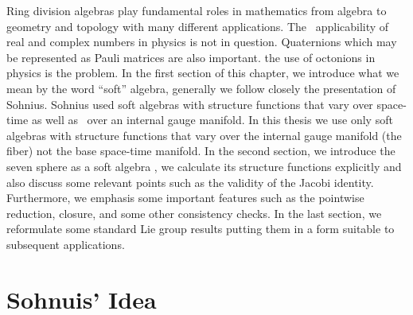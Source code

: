 \documentclass[a4paper,12pt]{book}
\begin{document}
Ring division algebras play fundamental roles in mathematics from algebra to
geometry and topology with many different applications. The \ applicability
of real and complex numbers in physics is not in question. Quaternions which
may be represented as Pauli matrices are also important. the use of
octonions in physics is the problem. In the first section of this chapter,
we introduce what we mean by the word ``soft'' algebra, generally we follow
closely the presentation of Sohnius\cite{soh}. Sohnius used soft algebras
with structure functions that vary over space-time as well as \ over an
internal gauge manifold. In this thesis we use only soft algebras with
structure functions that vary over the internal gauge manifold (the fiber)
not the base space-time manifold. In the second section, we introduce the
seven sphere as a soft algebra \cite{estps}, we calculate its structure
functions explicitly and also discuss some relevant points such as the
validity of the Jacobi identity. Furthermore, we emphasis some important
features such as the pointwise reduction, closure, and some other
consistency checks. In the last section, we reformulate some standard Lie
group results putting them in a form suitable to subsequent applications.

\section{Sohnuis' Idea}
\end{document}
